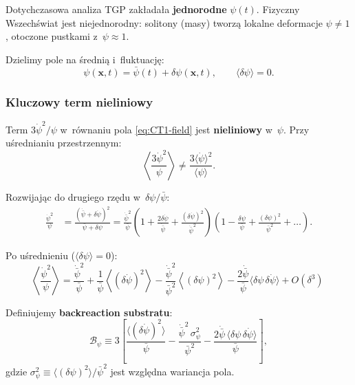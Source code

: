 Dotychczasowa analiza TGP zak\l{}ada\l{}a \textbf{jednorodne} $\psi(t)$.
Fizyczny Wszech\'swiat jest niejednorodny: solitony (masy) tworz\k{a}
lokalne deformacje $\psi \neq 1$, otoczone pustkami z~$\psi \approx 1$.

Dzielimy pole na \'sredni\k{a} i~fluktuacj\k{e}:
\begin{equation}
  \psi(\mathbf{x}, t) = \bar\psi(t) + \delta\psi(\mathbf{x}, t),
  \qquad
  \langle \delta\psi \rangle = 0.
  \label{eq:CT1-split}
\end{equation}

\subsubsection{Kluczowy term nieliniowy}

Term $3\dot\psi^2/\psi$ w~r\'ownaniu pola \eqref{eq:CT1-field} jest
\textbf{nieliniowy} w~$\psi$. Przy u\'srednianiu przestrzennym:
\begin{equation}
  \left\langle \frac{3\dot\psi^2}{\psi} \right\rangle
  \neq \frac{3\langle\dot\psi\rangle^2}{\langle\psi\rangle}.
  \label{eq:CT1-nonlinear}
\end{equation}

Rozwijaj\k{a}c do drugiego rz\k{e}du w~$\delta\psi/\bar\psi$:
\begin{align}
  \frac{\dot\psi^2}{\psi} &= \frac{(\dot{\bar\psi} + \delta\dot\psi)^2}{\bar\psi + \delta\psi}
  = \frac{\dot{\bar\psi}^2}{\bar\psi}\left(1 + \frac{2\delta\dot\psi}{\dot{\bar\psi}}
  + \frac{(\delta\dot\psi)^2}{\dot{\bar\psi}^2}\right)
  \left(1 - \frac{\delta\psi}{\bar\psi} + \frac{(\delta\psi)^2}{\bar\psi^2} + \dots\right).
\end{align}

Po u\'srednieniu ($\langle\delta\psi\rangle = 0$):
\begin{equation}
  \boxed{\;
  \left\langle\frac{\dot\psi^2}{\psi}\right\rangle
  = \frac{\dot{\bar\psi}^2}{\bar\psi}
    + \frac{1}{\bar\psi}\left\langle(\delta\dot\psi)^2\right\rangle
    - \frac{\dot{\bar\psi}^2}{\bar\psi^2}\left\langle(\delta\psi)^2\right\rangle
    - \frac{2\dot{\bar\psi}}{\bar\psi}\langle\delta\psi\,\delta\dot\psi\rangle
    + O(\delta^3)
  \;\;}
  \label{eq:CT1-backreaction-expansion}
\end{equation}

Definiujemy \textbf{backreaction substratu}:
\begin{equation}
  \mathcal{B}_\psi \equiv 3\left[
    \frac{\langle(\delta\dot\psi)^2\rangle}{\bar\psi}
    - \frac{\dot{\bar\psi}^2\,\sigma_\psi^2}{\bar\psi^2}
    - \frac{2\dot{\bar\psi}\,\langle\delta\psi\,\delta\dot\psi\rangle}{\bar\psi}
  \right],
  \label{eq:CT1-B-psi}
\end{equation}
gdzie $\sigma_\psi^2 \equiv \langle(\delta\psi)^2\rangle / \bar\psi^2$
jest wzgl\k{e}dna wariancja pola.

